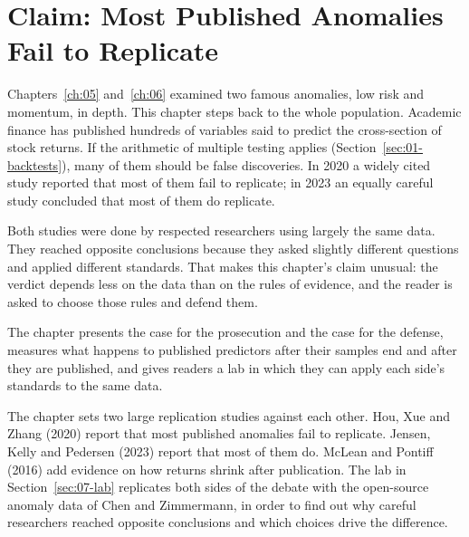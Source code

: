 \makeatletter
{}
\makeatother

\chapter{Claim: Most Published Anomalies Fail to Replicate}
\label{ch:07}

Chapters~\ref{ch:05} and~\ref{ch:06} examined two famous anomalies, low risk and momentum, in depth. This chapter steps back to the whole population. Academic finance has published hundreds of variables said to predict the cross-section of stock returns. If the arithmetic of multiple testing applies (Section~\ref{sec:01-backtests}), many of them should be false discoveries. In 2020 a widely cited study reported that most of them fail to replicate; in 2023 an equally careful study concluded that most of them do replicate.

Both studies were done by respected researchers using largely the same data. They reached opposite conclusions because they asked slightly different questions and applied different standards. That makes this chapter's claim unusual: the verdict depends less on the data than on the rules of evidence, and the reader is asked to choose those rules and defend them.

The chapter presents the case for the prosecution and the case for the defense, measures what happens to published predictors after their samples end and after they are published, and gives readers a lab in which they can apply each side's standards to the same data.

The chapter sets two large replication studies against each other. Hou, Xue and Zhang (2020) report that most published anomalies fail to replicate. Jensen, Kelly and Pedersen (2023) report that most of them do. McLean and Pontiff (2016) add evidence on how returns shrink after publication. The lab in Section~\ref{sec:07-lab} replicates both sides of the debate with the open-source anomaly data of Chen and Zimmermann, in order to find out why careful researchers reached opposite conclusions and which choices drive the difference.

